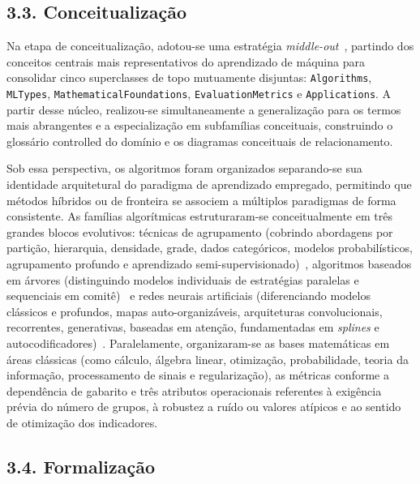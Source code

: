 \documentclass[11pt,a4paper]{article}
\newcommand{\onto}[1]{\texttt{\small #1}}
\begin{document}
\subsection{3.3. Conceitualização}

Na etapa de conceitualização, adotou-se uma estratégia \emph{middle-out}~\cite{fernandez1997methontology}, partindo dos conceitos centrais mais representativos do aprendizado de máquina para consolidar cinco superclasses de topo mutuamente disjuntas: \onto{Algorithms}, \onto{MLTypes}, \onto{MathematicalFoundations}, \onto{EvaluationMetrics} e \onto{Applications}. A partir desse núcleo, realizou-se simultaneamente a generalização para os termos mais abrangentes e a especialização em subfamílias conceituais, construindo o glossário controlled do domínio e os diagramas conceituais de relacionamento.

Sob essa perspectiva, os algoritmos foram organizados separando-se sua identidade arquitetural do paradigma de aprendizado empregado, permitindo que métodos híbridos ou de fronteira se associem a múltiplos paradigmas de forma consistente. As famílias algorítmicas estruturaram-se conceitualmente em três grandes blocos evolutivos: técnicas de agrupamento (cobrindo abordagens por partição, hierarquia, densidade, grade, dados categóricos, modelos probabilísticos, agrupamento profundo e aprendizado semi-supervisionado)~\cite{nagpal2013review,decarvalho2018gaussian,simoes2023gaussian,yin2026rapid}, algoritmos baseados em árvores (distinguindo modelos individuais de estratégias paralelas e sequenciais em comitê)~\cite{breiman1984cart,quinlan1993c45,freund1997decision,breiman2001random,geurts2006extremely,bentejac2021comparative} e redes neurais artificiais (diferenciando modelos clássicos e profundos, mapas auto-organizáveis, arquiteturas convolucionais, recorrentes, generativas, baseadas em atenção, fundamentadas em \emph{splines} e autocodificadores)~\cite{goodfellow2016deep,kohonen1982self,srivastava2014dropout,kingma2014vae,vaswani2017attention,liu2024kan}. Paralelamente, organizaram-se as bases matemáticas em áreas clássicas (como cálculo, álgebra linear, otimização, probabilidade, teoria da informação, processamento de sinais e regularização), as métricas conforme a dependência de gabarito e três atributos operacionais referentes à exigência prévia do número de grupos, à robustez a ruído ou valores atípicos e ao sentido de otimização dos indicadores.

\subsection{3.4. Formalização}
\end{document}
